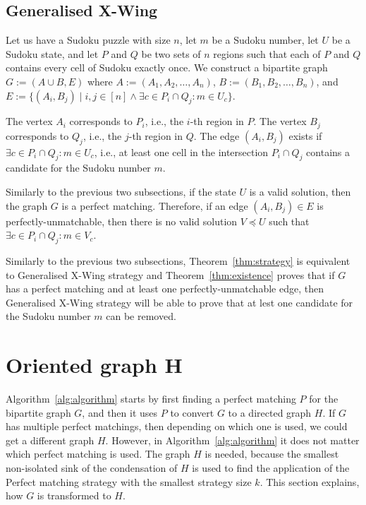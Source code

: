 \subsection*{Generalised X-Wing}

Let us have a Sudoku puzzle with size $n$, let $m$ be a Sudoku number, let $U$ be a Sudoku state, and
let $P$ and $Q$ be two sets of $n$ regions such that
each of $P$ and $Q$ contains every cell of Sudoku exactly once.
We construct a bipartite graph $G := (A \cup B, E)$ where
$A := (A_1, A_2, \dots, A_n)$, $B := (B_1, B_2, \dots, B_n)$, and
$E := \{(A_i, B_j) \mid i, j \in [n] \land \exists c \in P_i \cap Q_j: m \in U_c\}$.

The vertex $A_i$ corresponds to $P_i$, i.e., the $i$-th region in $P$.
The vertex $B_j$ corresponds to $Q_j$, i.e., the $j$-th region in $Q$.
The edge $(A_i, B_j)$ exists if $\exists c \in P_i \cap Q_j: m \in U_c$, i.e.,
at least one cell in the intersection $P_i \cap Q_j$ contains a candidate for the Sudoku number $m$.


Similarly to the previous two subsections, if the state $U$ is a valid solution,
then the graph $G$ is a perfect matching.
Therefore, if an edge $(A_i, B_j) \in E$ is perfectly-unmatchable,
then there is no valid solution $V \preceq U$ such that $\exists c \in P_i \cap Q_j: m \in V_c$.

Similarly to the previous two subsections,
Theorem~\ref{thm:strategy} is equivalent to Generalised X-Wing strategy and
Theorem~\ref{thm:existence} proves that if $G$ has a perfect matching and at least one perfectly-unmatchable edge,
then Generalised X-Wing strategy will be able to prove that
at lest one candidate for the Sudoku number $m$ can be removed.

\section{Oriented graph H}\label{sec:graph-h}

Algorithm~\ref{alg:algorithm} starts by first finding a perfect matching $P$ for the bipartite graph $G$, and then
it uses $P$ to convert $G$ to a directed graph $H$.
If $G$ has multiple perfect matchings, then depending on which one is used,
we could get a different graph $H$.
However, in Algorithm~\ref{alg:algorithm} it does not matter which perfect matching is used.
The graph $H$ is needed, because the smallest non-isolated sink of the condensation of $H$
is used to find the application of the Perfect matching strategy with the smallest strategy size $k$.
This section explains, how $G$ is transformed to $H$.

